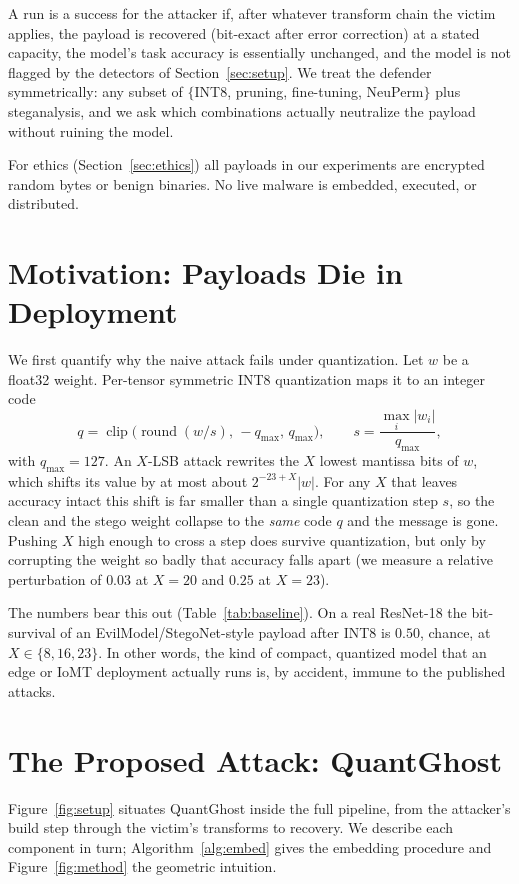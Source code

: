 \documentclass[a4paper,fleqn]{cas-dc}
\theoremstyle{plain}
\theoremstyle{remark}
\newcommand{\sys}{\mbox{QuantGhost}}
\begin{document}
A run is a success for the attacker if, after whatever transform chain the victim
applies, the payload is recovered (bit-exact after error correction) at a stated
capacity, the model's task accuracy is essentially unchanged, and the model is not
flagged by the detectors of Section~\ref{sec:setup}. We treat the defender
symmetrically: any subset of $\{$INT8, pruning, fine-tuning, NeuPerm$\}$ plus
steganalysis, and we ask which combinations actually neutralize the payload without
ruining the model.

For ethics (Section~\ref{sec:ethics}) all payloads in our experiments are encrypted
random bytes or benign binaries. No live malware is embedded, executed, or
distributed.

\section{Motivation: Payloads Die in Deployment}\label{sec:motiv}
We first quantify why the naive attack fails under quantization. Let
$w$ be a float32 weight. Per-tensor symmetric INT8 quantization maps it to an integer
code
\begin{equation}\label{eq:quant}
q=\operatorname{clip}\!\big(\operatorname{round}(w/s),\,-q_{\max},\,q_{\max}\big),
\qquad s=\frac{\max_i |w_i|}{q_{\max}},
\end{equation}
with $q_{\max}=127$. An $X$-LSB attack rewrites the $X$ lowest mantissa bits of $w$,
which shifts its value by at most about $2^{-23+X}|w|$. For any $X$ that leaves
accuracy intact this shift is far smaller than a single quantization step $s$, so the
clean and the stego weight collapse to the \emph{same} code $q$ and the message is
gone. Pushing $X$ high enough to cross a step does survive quantization, but only by
corrupting the weight so badly that accuracy falls apart (we measure a relative
perturbation of $0.03$ at $X{=}20$ and $0.25$ at $X{=}23$).

The numbers bear this out (Table~\ref{tab:baseline}). On a real ResNet-18 the
bit-survival of an EvilModel/StegoNet-style payload after INT8 is $0.50$, chance,
at $X\in\{8,16,23\}$. In other words, the kind of compact, quantized model that an
edge or IoMT deployment actually runs is, by accident, immune to the published
attacks.

\section{The Proposed Attack: \sys}\label{sec:method}
Figure~\ref{fig:setup} situates \sys{} inside the full pipeline, from the attacker's
build step through the victim's transforms to recovery. We describe each component in
turn; Algorithm~\ref{alg:embed} gives the embedding procedure and
Figure~\ref{fig:method} the geometric intuition.
\end{document}
